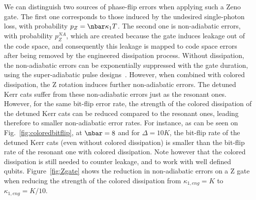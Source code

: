 We can distinguish two sources of phase-flip errors when applying such a Zeno gate. The first one corresponds to those induced by the undesired single-photon loss, with probability $p_Z = \nbar \kappa_1 T$. The second one is non-adiabatic errors, with probability $p_Z^{NA}$, which are created because the gate induces leakage out of the code space, and consequently this leakage is mapped to code space  errors after being removed by the engineered dissipation process. Without dissipation, the non-adiabatic errors can be exponentially suppressed with the gate duration, using the super-adiabatic pulse designs~\cite{Xu2021}. However, when combined with colored dissipation, the Z rotation induces further non-adiabatic errors. The detuned Kerr cats suffer from these non-adiabatic errors just as the resonant ones. However, for the same bit-flip error rate, the strength of the colored dissipation of the detuned Kerr cats can be reduced compared to the resonant ones, leading therefore to smaller non-adiabatic error rates. For instance, as can be seen on Fig.~\ref{fig:coloredbitflip}, at $\nbar = 8$ and for $\Delta = 10K$, the bit-flip rate of the detuned Kerr cats (even without colored dissipation) is smaller than the bit-flip rate of the resonant one with colored dissipation. Note however that the colored dissipation is still needed to counter leakage, and to work with well defined qubits. Figure~\ref{fig:Zgate} shows the reduction in non-adiabatic errors on a Z gate when reducing the strength of the colored dissipation from $\kappa_{1,eng}=K$ to $\kappa_{1,eng}=K/10$. 




